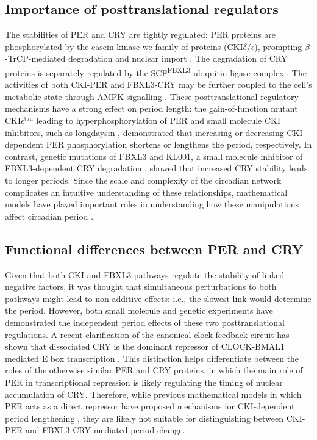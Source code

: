 \subsection{Importance of posttranslational regulators}
The stabilities of PER and CRY are tightly regulated: PER proteins are phosphorylated by the casein kinase we family of proteins (CKI$\delta/\epsilon$), prompting $\beta$-TrCP-mediated degradation \cite{Reischl2007} and nuclear import \cite{Takano2004}. 
The degradation of CRY proteins is separately regulated by the SCF\textsuperscript{FBXL3} ubiquitin ligase complex \cite{Busino2007, Godinho2007, Siepka2007}. 
The activities of both CKI-PER and FBXL3-CRY may be further coupled to the cell's metabolic state through AMPK signalling \cite{Lee2013}. 
These posttranslational regulatory mechanisms have a strong effect on period length: the gain-of-function mutant CKI$\epsilon^\mathrm{tau}$ leading to hyperphosphorylation of PER \cite{Gallego2006} and small molecule CKI inhibitors, such as longdaysin \cite{Hirota2010}, demonstrated that increasing or decreasing CKI-dependent PER phosphorylation shortens or lengthens the period, respectively. 
In contrast, genetic mutations of FBXL3 \cite{Godinho2007, Siepka2007} and KL001, a small molecule inhibitor of FBXL3-dependent CRY degradation \cite{Hirota2012}, showed that increased CRY stability leads to longer periods. 
Since the scale and complexity of the circadian network complicates an intuitive understanding of these relationships, mathematical models have played important roles in understanding how these manipulations affect circadian period \cite{Gallego2006, Hirota2012, Reischl2007}.

\subsection{Functional differences between PER and CRY}
Given that both CKI and FBXL3 pathways regulate the stability of linked negative factors, it was thought that simultaneous perturbations to both pathways might lead to non-additive effects: i.e., the slowest link would determine the period. 
 However, both small molecule \cite{Hirota2012} and genetic experiments \cite{Maywood2011} have demonstrated the independent period effects of these two posttranslational regulations. 
A recent clarification of the canonical clock feedback circuit has shown that dissociated CRY is the dominant repressor of CLOCK-BMAL1 mediated E box transcription \cite{Ye2011}. 
This distinction helps differentiate between the roles of the otherwise similar PER and CRY proteins, in which the main role of PER in transcriptional repression is likely regulating the timing of nuclear accumulation of CRY. 
Therefore, while previous mathematical models in which PER acts as a direct repressor have proposed mechanisms for CKI-dependent period lengthening \cite{Gallego2006, Vanselow2006}, they are likely not suitable for distinguishing between CKI-PER and FBXL3-CRY mediated period change.

